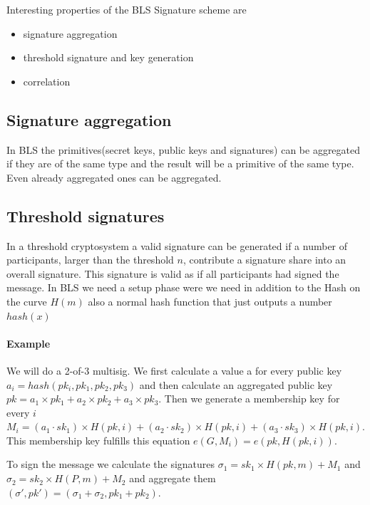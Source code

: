 \documentclass[a4paper,12pt]{scrartcl}
\begin{document}

Interesting properties of the BLS Signature scheme are
\begin{itemize}
	\item signature aggregation
	\item threshold signature and key generation
	\item correlation
\end{itemize}

\subsection{Signature aggregation}

In BLS the primitives(secret keys, public keys and signatures) can be aggregated if they are of the same type and the result will be a primitive of the same type. Even already aggregated ones can be aggregated.

\subsection{Threshold signatures}

In a threshold cryptosystem a valid signature can be generated if a number of participants, larger than the threshold $n$, contribute a signature share into an overall signature. This signature is valid as if all participants had signed the message. In BLS we need a setup phase were we need in addition to the Hash on the curve $H(m)$ also a normal hash function that just outputs a number $hash(x)$

\paragraph{Example}

We will do a 2-of-3 multisig.
We first calculate a value a for every public key $a_i = hash(pk_i,{pk_1,pk_2,pk_3})$ and then calculate an aggregated public key $pk = a_1\times{pk_1}+a_2\times{pk_2}+a_3\times{pk_3}$. Then we generate a membership key for every $i$ $M_i = (a_1 \cdot sk_1) \times{H(pk,i)} + (a_2 \cdot sk_2) \times{H(pk,i)} + (a_3 \cdot sk_3) \times{H(pk,i)}$. This membership key fulfills this equation $e(G,M_i) = e(pk,H(pk,i))$.

To sign the message we calculate the signatures $\sigma_1 = sk_1 \times{H(pk,m)} + M_1$ and $\sigma_2 = sk_2 \times{H(P,m)} + M_2$ and aggregate them $(\sigma',pk') = (\sigma_1 + \sigma_2, pk_1 + pk_2)$.
\end{document}
